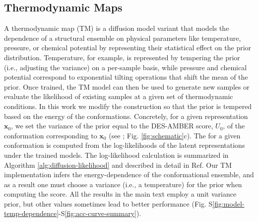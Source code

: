 \documentclass[%
aip,
 amsmath,amssymb,
reprint,%
twocolumn,
]{revtex4-1}
\makeatletter
\newcommand\setcurrentname[1]{\def\@currentlabelname{#1}}
\makeatother
\begin{document}
{%

\subsection*{Thermodynamic Maps}
\setcurrentname{Thermodynamic Maps}
\label{methods:thermodynamic-map}

A thermodynamic map (TM) is a diffusion model variant that models the dependence of a structural ensemble on physical parameters like temperature, pressure, or chemical potential by representing their statistical effect on the prior distribution.\cite{herron2024inferring,lee2025exponentially,beyerle2025inferring} Temperature, for example, is represented by tempering the prior (i.e., adjusting the variance) on a per-sample basis, while pressure and chemical potential correspond to exponential tilting operations that shift the mean of the prior.\cite{herron2024inferring,lee2025exponentially} Once trained, the TM model can then be used to generate new samples or evaluate the likelihood of existing samples at a given set of thermodynamic conditions. In this work we modify the construction so that the prior is tempered based on the energy of the conformations. Concretely, for a given representation $\mathbf{x}_0$, we set the variance of the prior equal to the DES-AMBER score, $U_0$, of the conformation corresponding to $\mathbf{x}_0$ (see ; Fig. \ref{fig:schematic}c). The  for a given conformation is computed from the log-likelihoods of the latent representations under the trained models. The log-likelihood calculation is summarized in Algorithm \ref{alg:diffusion-likelihood} and described in detail in Ref.\cite{john2025comparison} Our TM implementation infers the energy-dependence of the conformational ensemble, and as a result one must choose a variance (i.e., a temperature) for the prior when computing the score. All the results in the main text employ a unit variance prior, but other values sometimes lead to better performance (Fig. S\ref{fig:model-temp-dependence}-S\ref{fig:acc-curve-summary}).

}
\end{document}
